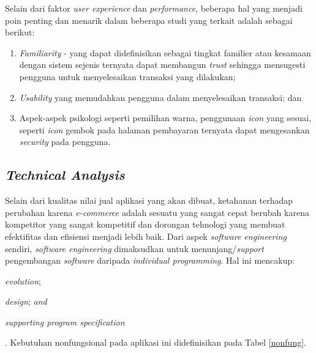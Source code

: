 Selain dari faktor \textit{user experience} dan \textit{performance}, beberapa hal yang menjadi poin penting dan menarik dalam beberapa studi yang terkait adalah sebagai berikut:
\begin{enumerate}[label=\alph*.]
	\item \textit{Familiarity} - yang dapat didefinisikan sebagai tingkat familier atau kesamaan dengan sistem sejenis ternyata dapat membangun \textit{trust} sehingga mensugesti pengguna untuk menyelesaikan transaksi yang dilakukan\cite{geven_e-commerce};
	\item \textit{Usability} yang memudahkan pengguna dalam menyelesaikan transaksi; dan
	\item Aspek-aspek psikologi seperti pemilihan warna, penggunaan \textit{icon} yang sesuai, seperti \textit{icon} gembok pada halaman pembayaran ternyata dapat mengesankan \textit{security} pada pengguna\cite{ewer_psychology_2014}\cite{coffin_color_2013}.
\end{enumerate}

\subsection{\textit{Technical Analysis}}
 Selain dari kualitas nilai jual aplikasi yang akan dibuat, ketahanan terhadap perubahan karena \textit{e-commerce} adalah sesuatu yang sangat cepat berubah karena kompetitor yang sangat kompetitif dan dorongan tehnologi yang membuat efektifitas dan efisiensi menjadi lebih baik.
Dari aspek \textit{software engineering} sendiri, \textit{software engineering} dimaksudkan untuk menunjang/\textit{support} pengembangan \textit{software} daripada \textit{individual programming}. Hal ini mencakup: \begin{inlinelist}
	\item \textit{evolution};
	\item \textit{design}; \textit{and}
	\item \textit{supporting program specification}
\end{inlinelist}\cite{software-engineering}.
Kebutuhan nonfungsional pada aplikasi ini didefinisikan pada Tabel \ref{nonfung}.

